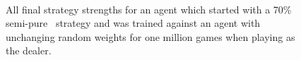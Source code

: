 
\begin{figure}
\center


	\begin{subfigure}[t]{0.22\textwidth}
		\caption{\handmaxmin}
	\end{subfigure}
	~
	\begin{subfigure}[t]{0.22\textwidth}
		\caption{\handmaxavg}
	\end{subfigure}
	~
	\begin{subfigure}[t]{0.22\textwidth}
		\caption{\handmaxmed}
	\end{subfigure}
	~
	\begin{subfigure}[t]{0.22\textwidth}
		\caption{\handmaxposs}
	\end{subfigure}

	\begin{subfigure}[t]{0.22\textwidth}
		\caption{\cribminavg}
	\end{subfigure}
	~
	\begin{subfigure}[t]{0.22\textwidth}
		\caption{\peggingmaxavggained}
	\end{subfigure}
	~
	\begin{subfigure}[t]{0.22\textwidth}
		\caption{\peggingmaxmedgained}
	\end{subfigure}
	~
	\begin{subfigure}[t]{0.22\textwidth}
		\caption{\peggingminavggiven}
	\end{subfigure}

\caption{
	All final strategy strengths for an agent
	which started with a 70\% semi-pure \handmaxavg\ strategy
	and was trained against an agent with unchanging random weights
	for one million games
	when playing as the dealer.
}
\label{fig:expts-sanitycheck-strats}
\end{figure}
